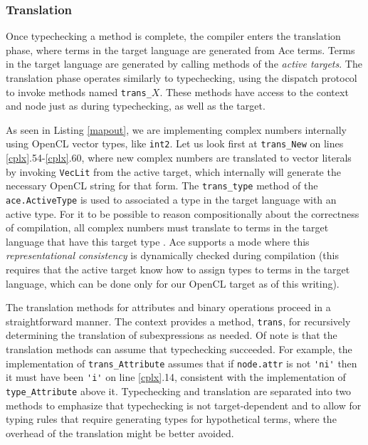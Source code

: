 \documentclass[9pt,preprint]{sigplanconf}
\begin{document}

\subsubsection{Translation}
Once typechecking a method is complete, the compiler enters the translation phase, where terms in the target language are generated from Ace terms. Terms in the target language are generated by calling methods of the \emph{active targets}. The translation phase operates similarly to typechecking, using the dispatch protocol to invoke methods named \verb|trans_|$X$. These methods have access to the context and node just as during typechecking, as well as the target.

As seen in Listing \ref{mapout}, we are implementing complex numbers internally using OpenCL vector types, like \verb|int2|. Let us look first at \verb|trans_New| on lines \ref{cplx}.54-\ref{cplx}.60, where new complex numbers are translated to vector literals by invoking \verb|VecLit| from the active target, which internally will generate the necessary OpenCL string for that form. The \verb|trans_type| method of the \verb|ace.ActiveType| is used to associated a type in the target language with an active type. For it to be possible to reason compositionally about the correctness of compilation, all complex numbers must translate to terms in the target language that have this target type \cite{tdc}. Ace supports a mode where this \emph{representational consistency} is dynamically checked during compilation (this requires that the active target know how to assign types to terms in the target language, which can be done only for our OpenCL target as of this writing).

The translation methods for attributes and binary operations proceed in a straightforward manner. The context provides a method, \verb|trans|, for recursively determining the translation of subexpressions as needed. Of note is that the translation methods can assume that typechecking succeeded. For example, the implementation of \verb|trans_Attribute| assumes that if \verb|node.attr| is not \verb|'ni'| then it must have been \verb|'i'| on line \ref{cplx}.14, consistent with the implementation of \verb|type_Attribute| above it. Typechecking and translation are separated into two methods to emphasize that typechecking is not target-dependent and to allow for typing rules that require generating types for hypothetical terms, where the overhead of the translation might be better avoided.
\end{document}
